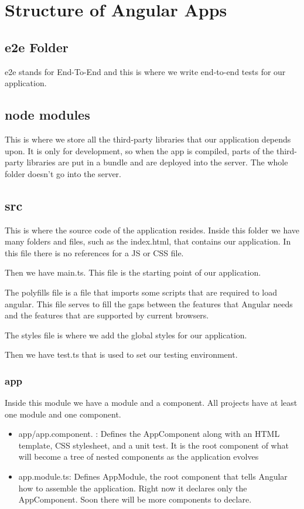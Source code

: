 \chapter{Structure of Angular Apps}
\section{e2e Folder}
e2e stands for End-To-End and this is where we write end-to-end tests for our application.

\section{node modules}
This is where we store all the third-party libraries that our application depends upon. It is only for development, so when the app is compiled, parts of the third-party libraries are put in a bundle and are deployed into the server. The whole folder doesn't go into the server.

\section{src}
This is where the source code of the application resides. Inside this folder we have many folders and files, such as the index.html, that contains our application. In this file there is no references for a JS or CSS file.

Then we have main.ts. This file is the starting point of our application.

The polyfills file is a file that imports some scripts that are required to load angular. This file serves to fill the gaps between the features that Angular needs and the features that are supported by current browsers.

The styles file is where we add the global styles for our application.

Then we have test.ts that is used to set our testing environment.

\subsection{app}
Inside this module we have a module and a component. All projects have at least one module and one component.
\begin{itemize}
    \item app/app.component. : Defines the AppComponent along with an HTML template, CSS stylesheet, and a unit test.
    It is the root component of what will become a tree of nested components as the application evolves
    \item app.module.ts: Defines AppModule, the root component that tells Angular how to assemble the application.
    Right now it declares only the AppComponent. Soon there will be more components to declare.
\end{itemize}


